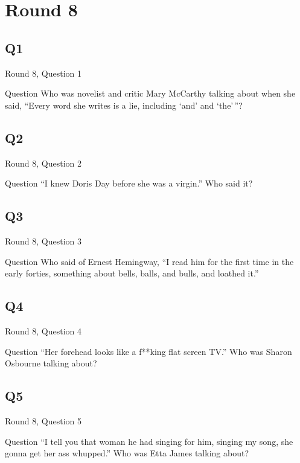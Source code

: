 \documentclass[11pt]{beamer}
\begin{document}
\section{Round 8}
\subsection*{Q1}
\begin{frame}[t]{Round 8, Question 1}
\begin{block}{Question}
Who was novelist and critic Mary McCarthy talking about when she said, ``Every word she writes is a lie, including `and' and `the'\,''?
\end{block}
\end{frame}
\subsection*{Q2}
\begin{frame}[t]{Round 8, Question 2}
\begin{block}{Question}
``I knew Doris Day before she was a virgin.'' Who said it?
\end{block}
\end{frame}
\subsection*{Q3}
\begin{frame}[t]{Round 8, Question 3}
\begin{block}{Question}
Who said of Ernest Hemingway, ``I read him for the first time in the early forties, something about bells, balls, and bulls, and loathed it.''
\end{block}
\end{frame}
\subsection*{Q4}
\begin{frame}[t]{Round 8, Question 4}
\begin{block}{Question}
``Her forehead looks like a f**king flat screen TV.'' Who was Sharon Osbourne talking about?
\end{block}
\end{frame}
\subsection*{Q5}
\begin{frame}[t]{Round 8, Question 5}
\begin{block}{Question}
``I tell you that woman he had singing for him, singing my song, she gonna get her ass whupped.'' Who was Etta James talking about?
\end{block}
\end{frame}
\end{document}
